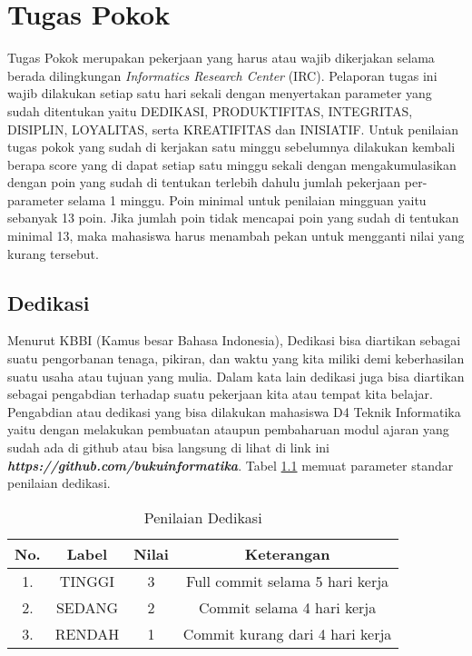 \chapter{Tugas Pokok}

Tugas Pokok merupakan pekerjaan yang harus atau wajib dikerjakan selama berada dilingkungan \textit{Informatics Research Center} (IRC). Pelaporan tugas ini wajib dilakukan setiap satu hari sekali dengan menyertakan parameter yang sudah ditentukan yaitu DEDIKASI, PRODUKTIFITAS, INTEGRITAS, DISIPLIN, LOYALITAS, serta KREATIFITAS dan INISIATIF. Untuk penilaian tugas pokok yang sudah di kerjakan satu minggu sebelumnya dilakukan kembali berapa score yang di dapat setiap satu minggu sekali dengan mengakumulasikan dengan poin yang sudah di tentukan terlebih dahulu jumlah pekerjaan per-parameter selama 1 minggu. Poin minimal untuk penilaian mingguan yaitu sebanyak 13 poin. Jika jumlah poin tidak mencapai poin yang sudah di tentukan minimal 13, maka mahasiswa harus menambah pekan untuk mengganti nilai yang kurang tersebut.

\section{Dedikasi}

Menurut KBBI (Kamus besar Bahasa Indonesia), Dedikasi bisa diartikan sebagai suatu pengorbanan tenaga, pikiran, dan waktu yang kita miliki demi keberhasilan suatu usaha atau tujuan yang mulia. Dalam kata lain dedikasi juga bisa diartikan sebagai pengabdian terhadap suatu pekerjaan kita atau tempat kita belajar. Pengabdian atau dedikasi yang bisa dilakukan mahasiswa D4 Teknik Informatika yaitu dengan melakukan pembuatan ataupun pembaharuan modul ajaran yang sudah ada di github atau bisa langsung di lihat di link ini \textbf{\textit{https://github.com/bukuinformatika}}. Tabel \ref{table:nilaidedikasi} memuat parameter standar penilaian dedikasi.

\begin{table}[H]
\caption{Penilaian Dedikasi}
\centering
\begin{tabular}{|c|c|c|c|}
\hline
\textbf{No.}&\textbf{Label}&\textbf{Nilai}&\textbf{Keterangan}\\
\hline
1.&TINGGI&3&Full commit selama 5 hari kerja\\
\hline
2.&SEDANG&2&Commit selama 4 hari kerja\\
\hline
3.&RENDAH&1&Commit kurang dari 4 hari kerja\\
\hline
\end{tabular}
\label{table:nilaidedikasi}
\end{table}

